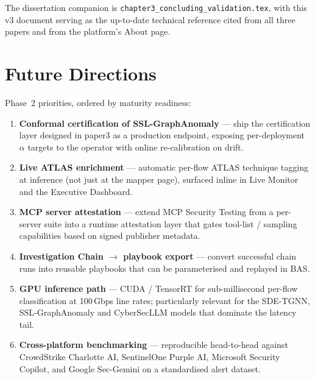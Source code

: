 \documentclass[11pt,a4paper]{article}
\begin{document}
The dissertation companion is
\texttt{chapter3\_concluding\_validation.tex}, with this v3 document
serving as the up-to-date technical reference cited from all three
papers and from the platform's About page.

\section{Future Directions}
\label{sec:future}

Phase~2 priorities, ordered by maturity readiness:

\begin{enumerate}
  \item \textbf{Conformal certification of SSL-GraphAnomaly} ---
        ship the certification layer designed in paper3 as a
        production endpoint, exposing per-deployment $\alpha$
        targets to the operator with online re-calibration on
        drift.
  \item \textbf{Live ATLAS enrichment} --- automatic per-flow ATLAS
        technique tagging at inference (not just at the mapper
        page), surfaced inline in Live Monitor and the Executive
        Dashboard.
  \item \textbf{MCP server attestation} --- extend MCP Security
        Testing from a per-server suite into a runtime attestation
        layer that gates tool-list / sampling capabilities based on
        signed publisher metadata.
  \item \textbf{Investigation Chain $\to$ playbook export} ---
        convert successful chain runs into reusable playbooks that
        can be parameterised and replayed in BAS.
  \item \textbf{GPU inference path} --- CUDA / TensorRT for
        sub-millisecond per-flow classification at 100\,Gbps line
        rates; particularly relevant for the SDE-TGNN, SSL-GraphAnomaly
        and CyberSecLLM models that dominate the latency tail.
  \item \textbf{Cross-platform benchmarking} --- reproducible
        head-to-head against CrowdStrike Charlotte AI, SentinelOne
        Purple AI, Microsoft Security Copilot, and Google Sec-Gemini
        on a standardised alert dataset.
\end{enumerate}

\end{document}
